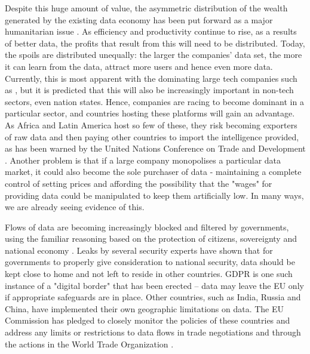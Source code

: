 Despite this huge amount of value, the asymmetric distribution of the wealth generated by the existing data economy has been put forward as a major humanitarian issue \cite{TheWinner2020Feb}. As efficiency and productivity continue to rise, as a results of better data, the profits that result from this will need to be distributed. Today, the spoils are distributed unequally: the larger the companies' data set, the more it can learn from the data, attract more users and hence even more data. Currently, this is most apparent with the dominating large tech companies such as , but it is predicted that this will also be increasingly important in non-tech sectors, even nation states. Hence, companies are racing to become dominant in a particular sector, and countries hosting these platforms will gain an advantage. As Africa and Latin America host so few of these, they risk becoming exporters of raw data and then paying other countries to import the intelligence provided, as has been warned by the United Nations Conference on Trade and Development \cite{TheWinner2020Feb}. Another problem is that if a large company monopolises a particular data market, it could also become the sole purchaser of data - maintaining a complete control of setting prices and affording the possibility that the "wages" for providing data could be manipulated to keep them artificially low. In many ways, we are already seeing evidence of this. 


Flows of data are becoming increasingly blocked and filtered by governments, using the familiar reasoning based on the protection of citizens, sovereignty and national economy \cite{VirtualNationalism2020Feb}. Leaks by several security experts have shown that for governments to properly give consideration to national security,  data should be kept close to home and not left to reside in other countries. GDPR is one such instance of a "digital border" that has been erected -- data may leave the EU only if appropriate safeguards are in place. Other countries, such as India, Russia and China, have implemented their own geographic limitations on data. The EU Commission has pledged to closely monitor the policies of these countries and address any limits or restrictions to data flows in trade negotiations and through the actions in the World Trade Organization \cite{EUWhitePaperAI2020Feb}.

